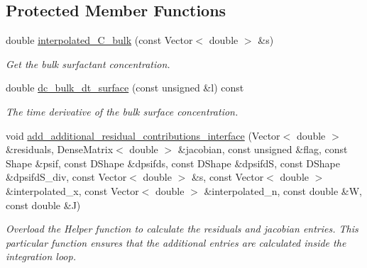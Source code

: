 \subsection*{Protected Member Functions}
\begin{DoxyCompactItemize}
\item 
double \hyperlink{classElasticAxisymmetricSolubleSurfactantTransportInterfaceElement_a9be81fbc02916555947d831f776fbbad}{interpolated\+\_\+\+C\+\_\+bulk} (const Vector$<$ double $>$ \&s)
\begin{DoxyCompactList}\small\item\em Get the bulk surfactant concentration. \end{DoxyCompactList}\item 
double \hyperlink{classElasticAxisymmetricSolubleSurfactantTransportInterfaceElement_a7a1bdaf7177d0db70c2461a24c40a364}{dc\+\_\+bulk\+\_\+dt\+\_\+surface} (const unsigned \&l) const
\begin{DoxyCompactList}\small\item\em The time derivative of the bulk surface concentration. \end{DoxyCompactList}\item 
void \hyperlink{classElasticAxisymmetricSolubleSurfactantTransportInterfaceElement_a054c0dfcc88814e128318c7ad30e6e31}{add\+\_\+additional\+\_\+residual\+\_\+contributions\+\_\+interface} (Vector$<$ double $>$ \&residuals, Dense\+Matrix$<$ double $>$ \&jacobian, const unsigned \&flag, const Shape \&psif, const D\+Shape \&dpsifds, const D\+Shape \&dpsifdS, const D\+Shape \&dpsifd\+S\+\_\+div, const Vector$<$ double $>$ \&s, const Vector$<$ double $>$ \&interpolated\+\_\+x, const Vector$<$ double $>$ \&interpolated\+\_\+n, const double \&W, const double \&J)
\begin{DoxyCompactList}\small\item\em Overload the Helper function to calculate the residuals and jacobian entries. This particular function ensures that the additional entries are calculated inside the integration loop. \end{DoxyCompactList}\end{DoxyCompactItemize}
